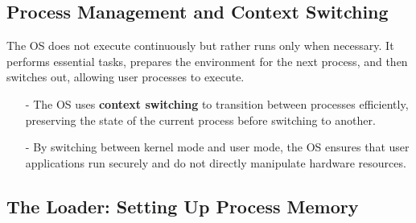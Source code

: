 \subsection{Process Management and Context Switching}

The OS does not execute continuously but rather runs only when necessary. It performs essential tasks, prepares the environment for the next process, and then switches out, allowing user processes to execute.

\begin{itemize}
  \item[-] The OS uses \textbf{context switching} to transition between processes efficiently, preserving the state of the current process before switching to another.
  \item[-] By switching between kernel mode and user mode, the OS ensures that user applications run securely and do not directly manipulate hardware resources.
\end{itemize}

\subsection*{The Loader: Setting Up Process Memory}

